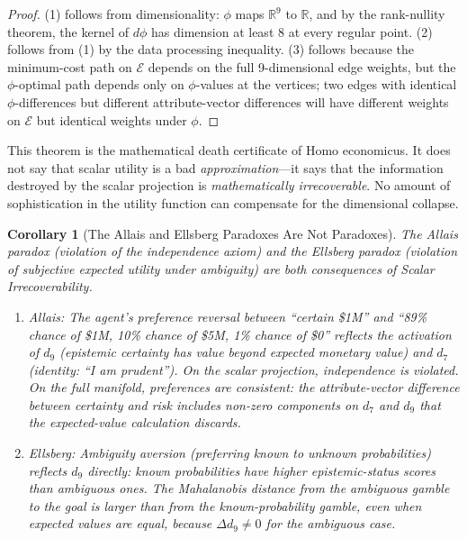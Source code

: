 \documentclass[12pt]{article}
\newtheorem{corollary}[theorem]{Corollary}
\theoremstyle{definition}
\theoremstyle{remark}
\newcommand{\E}{\mathcal{E}}               %
\newcommand{\R}{\mathbb{R}}
\begin{document}
\begin{proof}
(1) follows from dimensionality: $\phi$ maps $\R^9$ to $\R$, and by the rank-nullity theorem, the kernel of $d\phi$ has dimension at least 8 at every regular point.  (2) follows from (1) by the data processing inequality.  (3) follows because the minimum-cost path on $\E$ depends on the full 9-dimensional edge weights, but the $\phi$-optimal path depends only on $\phi$-values at the vertices; two edges with identical $\phi$-differences but different attribute-vector differences will have different weights on $\E$ but identical weights under $\phi$.
\end{proof}

This theorem is the mathematical death certificate of Homo economicus.  It does not say that scalar utility is a bad \emph{approximation}---it says that the information destroyed by the scalar projection is \emph{mathematically irrecoverable}.  No amount of sophistication in the utility function can compensate for the dimensional collapse.

\begin{corollary}[The Allais and Ellsberg Paradoxes Are Not Paradoxes]
\label{cor:allais}
The Allais paradox \cite{allais1953} (violation of the independence axiom) and the Ellsberg paradox \cite{ellsberg1961} (violation of subjective expected utility under ambiguity) are both consequences of Scalar Irrecoverability.
\begin{enumerate}
    \item \emph{Allais:} The agent's preference reversal between ``certain \$1M'' and ``89\% chance of \$1M, 10\% chance of \$5M, 1\% chance of \$0'' reflects the activation of $d_9$ (epistemic certainty has value beyond expected monetary value) and $d_7$ (identity: ``I am prudent'').  On the scalar projection, independence is violated.  On the full manifold, preferences are consistent: the attribute-vector difference between certainty and risk includes non-zero components on $d_7$ and $d_9$ that the expected-value calculation discards.
    \item \emph{Ellsberg:} Ambiguity aversion (preferring known to unknown probabilities) reflects $d_9$ directly: known probabilities have higher epistemic-status scores than ambiguous ones.  The Mahalanobis distance from the ambiguous gamble to the goal is larger than from the known-probability gamble, even when expected values are equal, because $\Delta d_9 \neq 0$ for the ambiguous case.
\end{enumerate}
\end{corollary}
\end{document}
